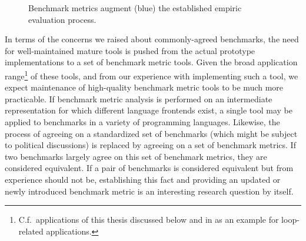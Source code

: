 \begin{figure}
\caption{Benchmark metrics augment (blue) the established empiric evaluation process.}
\label{fig:richmetricsprocess}
\end{figure}

In terms of the concerns we raised about commonly-agreed benchmarks, the need for well-maintained mature tools is pushed from the actual prototype implementations to a set of benchmark metric tools. Given the broad application range\footnote{C.f.\ applications of this thesis discussed below and in  as an example for loop-related applications.} of these tools, and from our experience with implementing such a tool, we expect maintenance of high-quality benchmark metric tools to be much more practicable. If benchmark metric analysis is performed on an intermediate representation for which different language frontends exist, a single tool may be applied to benchmarks in a variety of programming languages. Likewise, the process of agreeing on a standardized set of benchmarks (which might be subject to political discussions) is replaced by agreeing on a set of benchmark metrics. If two benchmarks largely agree on this set of benchmark metrics, they are considered equivalent. If a pair of benchmarks is considered equivalent but from experience should not be, establishing this fact and providing an updated or newly introduced benchmark metric is an interesting research question by itself.

